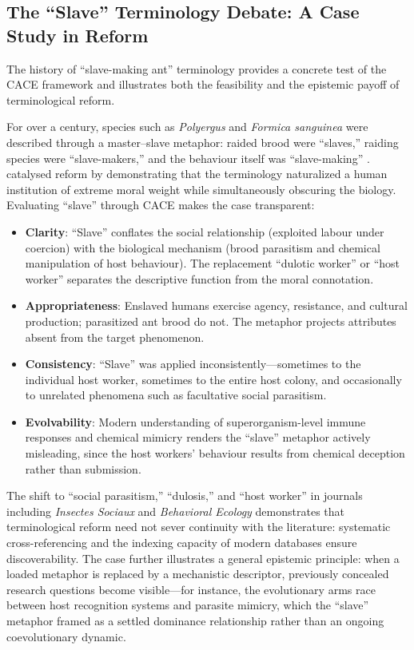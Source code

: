\documentclass[
]{article}
\providecommand{\tightlist}{%
  \setlength{\itemsep}{0pt}\setlength{\parskip}{0pt}}
\numberwithin{equation}{section}
\begin{document}
\subsection{The ``Slave'' Terminology Debate: A Case Study in
Reform}\label{the-slave-terminology-debate-a-case-study-in-reform}

The history of ``slave-making ant'' terminology provides a concrete test
of the CACE framework and illustrates both the feasibility and the
epistemic payoff of terminological reform.

For over a century, species such as \emph{Polyergus} and \emph{Formica
sanguinea} were described through a master--slave metaphor: raided brood
were ``slaves,'' raiding species were ``slave-makers,'' and the
behaviour itself was ``slave-making'' \cite{hölldobler1990}.
\citet{herbers2006, herbers2007} catalysed reform by demonstrating that
the terminology naturalized a human institution of extreme moral weight
while simultaneously obscuring the biology. Evaluating ``slave'' through
CACE makes the case transparent:

\begin{itemize}
\tightlist
\item
  \textbf{Clarity}: ``Slave'' conflates the social relationship
  (exploited labour under coercion) with the biological mechanism (brood
  parasitism and chemical manipulation of host behaviour). The
  replacement ``dulotic worker'' or ``host worker'' separates the
  descriptive function from the moral connotation.
\item
  \textbf{Appropriateness}: Enslaved humans exercise agency, resistance,
  and cultural production; parasitized ant brood do not. The metaphor
  projects attributes absent from the target phenomenon.
\item
  \textbf{Consistency}: ``Slave'' was applied inconsistently---sometimes
  to the individual host worker, sometimes to the entire host colony,
  and occasionally to unrelated phenomena such as facultative social
  parasitism.
\item
  \textbf{Evolvability}: Modern understanding of superorganism-level
  immune responses and chemical mimicry \cite{wilson2008superorganism}
  renders the ``slave'' metaphor actively misleading, since the host
  workers' behaviour results from chemical deception rather than
  submission.
\end{itemize}

The shift to ``social parasitism,'' ``dulosis,'' and ``host worker'' in
journals including \emph{Insectes Sociaux} and \emph{Behavioral Ecology}
demonstrates that terminological reform need not sever continuity with
the literature: systematic cross-referencing and the indexing capacity
of modern databases ensure discoverability. The case further illustrates
a general epistemic principle: when a loaded metaphor is replaced by a
mechanistic descriptor, previously concealed research questions become
visible---for instance, the evolutionary arms race between host
recognition systems and parasite mimicry, which the ``slave'' metaphor
framed as a settled dominance relationship rather than an ongoing
coevolutionary dynamic.
\end{document}
